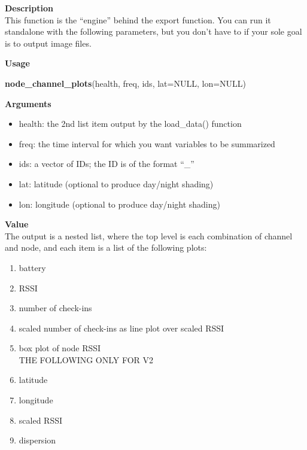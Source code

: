 \documentclass[
]{book}
\newenvironment{Shaded}{\begin{snugshade}}{\end{snugshade}}
\newcommand{\AttributeTok}[1]{\textcolor[rgb]{0.13,0.29,0.53}{#1}}
\newcommand{\ConstantTok}[1]{\textcolor[rgb]{0.56,0.35,0.01}{#1}}
\newcommand{\FunctionTok}[1]{\textcolor[rgb]{0.13,0.29,0.53}{\textbf{#1}}}
\newcommand{\NormalTok}[1]{#1}
\providecommand{\tightlist}{%
  \setlength{\itemsep}{0pt}\setlength{\parskip}{0pt}}
\begin{document}
\textbf{Description}\\
This function is the ``engine'' behind the export function. You can run it standalone with the following parameters, but you don't have to if your sole goal is to output image files.

\textbf{Usage}

\begin{Shaded}
\begin{Highlighting}[]
\FunctionTok{node\_channel\_plots}\NormalTok{(health, freq, ids, }\AttributeTok{lat=}\ConstantTok{NULL}\NormalTok{, }\AttributeTok{lon=}\ConstantTok{NULL}\NormalTok{)  }
\end{Highlighting}
\end{Shaded}

\textbf{Arguments}

\begin{itemize}
\tightlist
\item
  health: the 2nd list item output by the load\_data() function\\
\item
  freq: the time interval for which you want variables to be summarized\\
\item
  ids: a vector of IDs; the ID is of the format ``\_''\\
\item
  lat: latitude (optional to produce day/night shading)
\item
  lon: longitude (optional to produce day/night shading)
\end{itemize}

\textbf{Value}\\
The output is a nested list, where the top level is each combination of channel and node, and each item is a list of the following plots:

\begin{enumerate}
\def\labelenumi{\arabic{enumi}.}
\tightlist
\item
  battery\\
\item
  RSSI\\
\item
  number of check-ins\\
\item
  scaled number of check-ins as line plot over scaled RSSI\\
\item
  box plot of node RSSI\\
  THE FOLLOWING ONLY FOR V2\\
\item
  latitude\\
\item
  longitude\\
\item
  scaled RSSI\\
\item
  dispersion
\end{enumerate}
\end{document}
